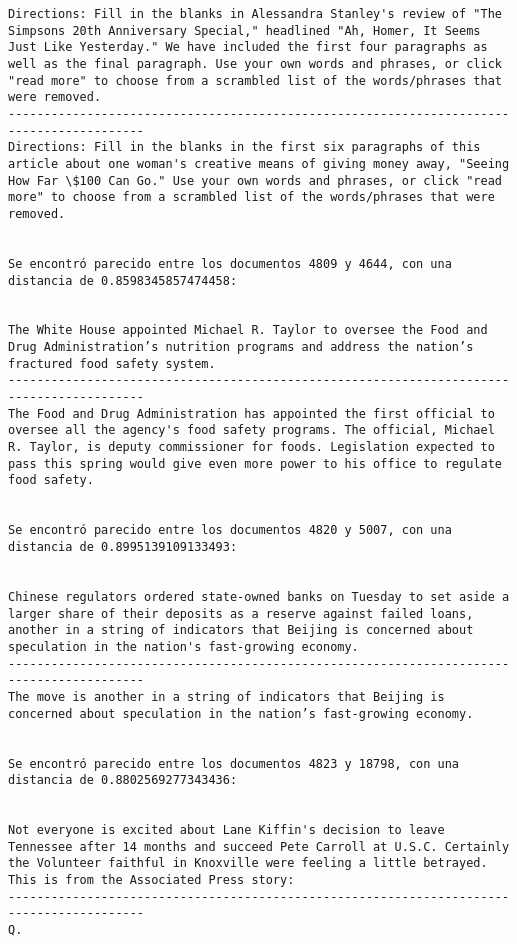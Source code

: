 \documentclass[11pt]{article}
\begin{document}
\begin{Verbatim}[commandchars=\\\{\}]
Directions: Fill in the blanks in Alessandra Stanley's review of "The Simpsons 20th Anniversary Special," headlined "Ah, Homer, It Seems Just Like Yesterday." We have included the first four paragraphs as well as the final paragraph. Use your own words and phrases, or click "read more" to choose from a scrambled list of the words/phrases that were removed.
-----------------------------------------------------------------------------------------
Directions: Fill in the blanks in the first six paragraphs of this article about one woman's creative means of giving money away, "Seeing How Far \$100 Can Go." Use your own words and phrases, or click "read more" to choose from a scrambled list of the words/phrases that were removed.


Se encontró parecido entre los documentos 4809 y 4644, con una distancia de 0.8598345857474458:


The White House appointed Michael R. Taylor to oversee the Food and Drug Administration’s nutrition programs and address the nation’s fractured food safety system.
-----------------------------------------------------------------------------------------
The Food and Drug Administration has appointed the first official to oversee all the agency's food safety programs. The official, Michael R. Taylor, is deputy commissioner for foods. Legislation expected to pass this spring would give even more power to his office to regulate food safety.


Se encontró parecido entre los documentos 4820 y 5007, con una distancia de 0.8995139109133493:


Chinese regulators ordered state-owned banks on Tuesday to set aside a larger share of their deposits as a reserve against failed loans, another in a string of indicators that Beijing is concerned about speculation in the nation's fast-growing economy.
-----------------------------------------------------------------------------------------
The move is another in a string of indicators that Beijing is concerned about speculation in the nation’s fast-growing economy.


Se encontró parecido entre los documentos 4823 y 18798, con una distancia de 0.8802569277343436:


Not everyone is excited about Lane Kiffin's decision to leave Tennessee after 14 months and succeed Pete Carroll at U.S.C. Certainly the Volunteer faithful in Knoxville were feeling a little betrayed. This is from the Associated Press story:
-----------------------------------------------------------------------------------------
Q.



\end{Verbatim}
\end{document}
